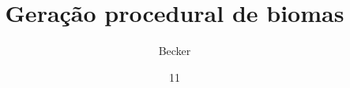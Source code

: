 \documentclass[tg]{mdtuffs}
\title{Geração procedural de biomas}
\author{Becker}{João Carlos}
\institute{Ciência da Computação}
\date{11}{Dezembro}{2017}
\begin{document}
\maketitle




\makeapprove





\end{document}
